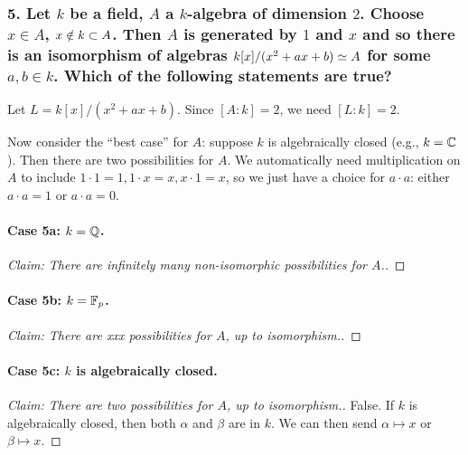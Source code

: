\subsubsection*{5. Let $k$ be a field, $A$ a $k$-algebra of dimension $2$. Choose $x \in A$, $x \notin k \subset A$. Then $A$ is generated by $1$ and $x$ and so there is an isomorphism of algebras $k[x]/(x^2 + ax + b) \simeq A$ for some $a, b \in k$. Which of the following statements are true?}

Let $L = k[x] / (x^2 + ax + b)$. Since $[A : k] = 2$, we need $[L : k] = 2$. 

Now consider the ``best case'' for $A$: suppose $k$ is algebraically closed (e.g., $k = \mathbb{C}$). Then there are two possibilities for $A$. We automatically need multiplication on $A$ to include $1 \cdot 1 = 1, 1 \cdot x = x, x \cdot 1 = x$, so we just have a choice for $a \cdot a$: either $a \cdot a = 1$ or $a \cdot a = 0$.

\paragraph*{Case 5a: $k = \mathbb{Q}$.}
\begin{proof}[Claim: There are \emph{infinitely many} non-isomorphic possibilities for $A$.]

\end{proof}

\paragraph*{Case 5b: $k = \mathbb{F}_p$.}
\begin{proof}[Claim: There are \emph{xxx} possibilities for $A$, up to isomorphism.]

\end{proof}

\paragraph*{Case 5c: $k$ is algebraically closed.}
\begin{proof}[Claim: There are \emph{two} possibilities for $A$, up to isomorphism.]
False. If $k$ is algebraically closed, then both $\alpha$ and $\beta$ are in $k$. We can then send $\alpha \mapsto x$ or $\beta \mapsto x$.
\end{proof}
